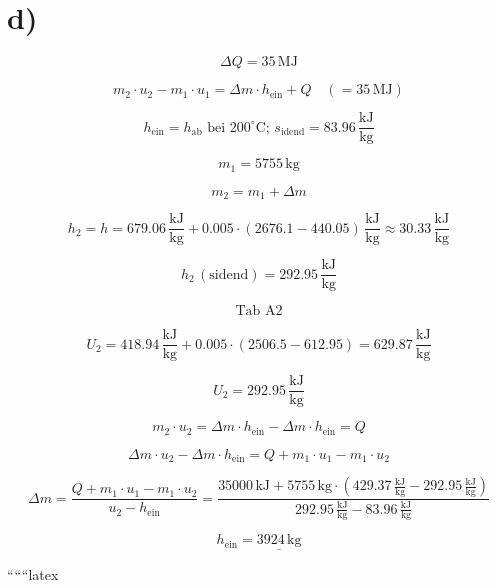 

\section*{d)}

\[
\Delta Q = 35 \, \text{MJ}
\]

\[
m_2 \cdot u_2 - m_1 \cdot u_1 = \Delta m \cdot h_{\text{ein}} + Q \quad \left( = 35 \, \text{MJ} \right)
\]

\[
h_{\text{ein}} = h_{\text{ab}} \text{ bei } 200^\circ \text{C}; \, s_{\text{idend}} = 83.96 \, \frac{\text{kJ}}{\text{kg}}
\]

\[
m_1 = 5755 \, \text{kg}
\]

\[
m_2 = m_1 + \Delta m
\]

\[
h_2 = h = 679.06 \, \frac{\text{kJ}}{\text{kg}} + 0.005 \cdot (2676.1 - 440.05) \, \frac{\text{kJ}}{\text{kg}} \approx 30.33 \, \frac{\text{kJ}}{\text{kg}}
\]

\[
h_2 \, (\text{sidend}) = 292.95 \, \frac{\text{kJ}}{\text{kg}}
\]

\[
\text{Tab A2}
\]

\[
U_2 = 418.94 \, \frac{\text{kJ}}{\text{kg}} + 0.005 \cdot (2506.5 - 612.95) = 629.87 \, \frac{\text{kJ}}{\text{kg}}
\]

\[
U_2 = 292.95 \, \frac{\text{kJ}}{\text{kg}}
\]

\[
m_2 \cdot u_2 = \Delta m \cdot h_{\text{ein}} - \Delta m \cdot h_{\text{ein}} = Q
\]

\[
\Delta m \cdot u_2 - \Delta m \cdot h_{\text{ein}} = Q + m_1 \cdot u_1 - m_1 \cdot u_2
\]

\[
\Delta m = \frac{Q + m_1 \cdot u_1 - m_1 \cdot u_2}{u_2 - h_{\text{ein}}} = \frac{35000 \, \text{kJ} + 5755 \, \text{kg} \cdot (429.37 \, \frac{\text{kJ}}{\text{kg}} - 292.95 \, \frac{\text{kJ}}{\text{kg}})}{292.95 \, \frac{\text{kJ}}{\text{kg}} - 83.96 \, \frac{\text{kJ}}{\text{kg}}}
\]

\[
h_{\text{ein}} = \underline{3924 \, \text{kg}}
\]

``````latex